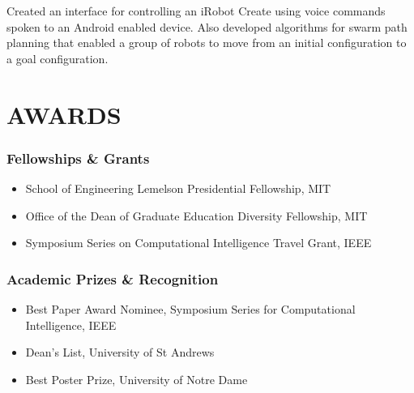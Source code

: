 \documentclass[line,margin]{cv}
\begin{document}
\begin{resume}
\begin{adjustwidth}{2.5em}{2.5em}
    Created an interface for controlling an iRobot Create using voice commands
    spoken to an Android enabled device. Also developed algorithms for swarm
    path planning that enabled a group of robots to move from an initial
    configuration to a goal configuration.

\end{adjustwidth}

% 
% 
% 

\section{AWARDS}

\subsubsection{Fellowships \& Grants}

\begin{itemize}

    \item School of Engineering Lemelson Presidential Fellowship, MIT
    \item Office of the Dean of Graduate Education Diversity Fellowship, MIT
    \item Symposium Series on Computational Intelligence Travel Grant, IEEE

\end{itemize}

\subsubsection{Academic Prizes \& Recognition}

\begin{itemize}

    \item Best Paper Award Nominee, Symposium Series for Computational
        Intelligence, IEEE
    \item Dean's List, University of St Andrews
    \item Best Poster Prize, University of Notre Dame


\end{itemize}
\end{resume}
\end{document}
